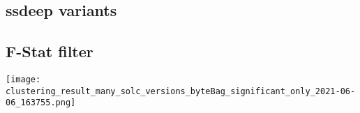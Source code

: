 \documentclass[../main.tex]{subfiles}
\begin{document}


\subsection{ssdeep variants}

\subsection{F-Stat filter}

\texttt{[image: clustering\_result\_many\_solc\_versions\_byteBag\_significant\_only\_2021-06-06\_163755.png]}
\end{document}
